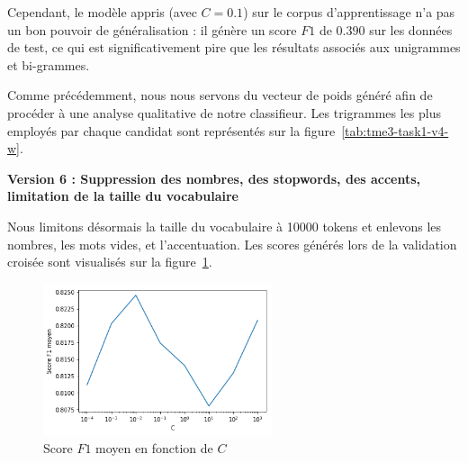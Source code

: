 \documentclass[a4paper]{article}
\newcommand{\figref}[1]{figure~\ref{#1}}
\begin{document}
Cependant, le modèle appris (avec $C=0.1$) sur le corpus d'apprentissage n'a pas
un bon pouvoir de généralisation : il génère un score $F1$ de $0.390$ sur les
données de test, ce qui est significativement pire que les résultats associés
aux unigrammes et bi-grammes. 

Comme précédemment, nous nous servons du vecteur de poids généré afin de
procéder à une analyse qualitative de notre classifieur. Les trigrammes les plus
employés par chaque candidat sont représentés sur la \figref{tab:tme3-task1-v4-w}.

\begin{table}[H]
\centering
{}
\caption{10 trigrammes les plus polarisés pour J. Chirac et F. Mitterrand}
\label{tab:tme3-task1-v4-w}
\end{table}



\textbf{Version 6 : Suppression des nombres, des stopwords, des accents, limitation de la
taille du vocabulaire}

Nous limitons désormais la taille du vocabulaire à 10000 tokens et enlevons les
nombres, les mots vides, et l'accentuation. Les scores générés lors de la
validation croisée sont visualisés sur la \figref{img:tme2-task1-v5}.

\begin{figure}[H]
	\center 
	\includegraphics[width=0.6\textwidth]{images/tme2/task1_v5.png}
    \caption{Score $F1$ moyen en fonction de $C$}
    \label{img:tme2-task1-v5}
\end{figure}
\end{document}
